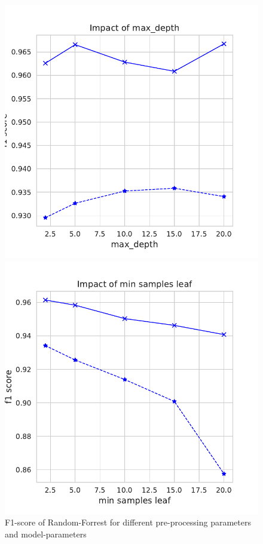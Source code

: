 \documentclass[11pt]{article}
\begin{document}
\begin{figure}
\begin{minipage}[t]{0.3\textwidth}
\end{minipage}
\begin{minipage}[t]{0.3\textwidth}
\includegraphics[width=1\linewidth]{email_spam/rnd_depth.pdf}
\end{minipage}
\begin{minipage}[t]{0.3\textwidth}
\includegraphics[width=1\linewidth]{email_spam/rnd_min_samples_leaf.pdf}
\end{minipage}
   \caption{F1-score of Random-Forrest for different pre-processing parameters and model-parameters}
\label{spamfig_fig2}
\end{figure}
\end{document}

